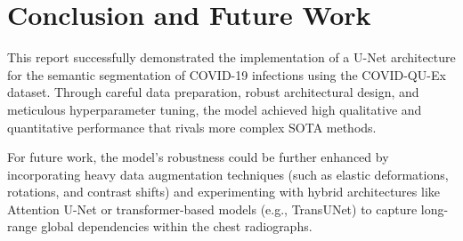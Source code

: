 \documentclass[conference]{IEEEtran}
\begin{document}
\section{Conclusion and Future Work}
This report successfully demonstrated the implementation of a U-Net architecture for the semantic segmentation of COVID-19 infections using the COVID-QU-Ex dataset. Through careful data preparation, robust architectural design, and meticulous hyperparameter tuning, the model achieved high qualitative and quantitative performance that rivals more complex SOTA methods. 

For future work, the model's robustness could be further enhanced by incorporating heavy data augmentation techniques (such as elastic deformations, rotations, and contrast shifts) and experimenting with hybrid architectures like Attention U-Net or transformer-based models (e.g., TransUNet) to capture long-range global dependencies within the chest radiographs.
\end{document}
